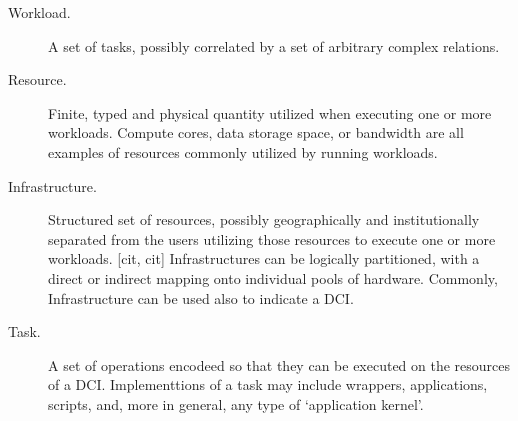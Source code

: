 \documentclass{sig-alternate}
\begin{document}

\begin{description}


\item[Workload.] A set of tasks, possibly correlated by a set of
arbitrary complex relations.

\item[Resource.] Finite, typed and physical quantity utilized when
executing one or more workloads. Compute cores, data storage space, or
bandwidth are all examples of resources commonly utilized by running
workloads.

\item[Infrastructure.] Structured set of resources, possibly
geographically and institutionally separated from the users   utilizing
those resources to execute one or more workloads. [cit, cit]
Infrastructures can be logically partitioned, with a direct or indirect
mapping onto individual pools of hardware. Commonly, Infrastructure can
be used also to indicate a DCI.


\item[Task.] A set of operations encodeed so that they can be executed
on the resources of a DCI. Implementtions of a task may include
wrappers, applications, scripts, and, more in general, any type of
`application kernel'.


\end{description}
\end{document}
